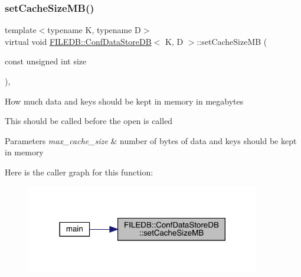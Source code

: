 \subsubsection{\texorpdfstring{setCacheSizeMB()}{setCacheSizeMB()}\hspace{0.1cm}{\footnotesize\ttfamily [1/2]}}
{\footnotesize\ttfamily template$<$typename K, typename D$>$ \\
virtual void \mbox{\hyperlink{classFILEDB_1_1ConfDataStoreDB}{F\+I\+L\+E\+D\+B\+::\+Conf\+Data\+Store\+DB}}$<$ K, D $>$\+::set\+Cache\+Size\+MB (\begin{DoxyParamCaption}\item[{const unsigned int}]{size }\end{DoxyParamCaption})\hspace{0.3cm}{\ttfamily [inline]}, {\ttfamily [virtual]}}

How much data and keys should be kept in memory in megabytes

This should be called before the open is called 
\begin{DoxyParams}{Parameters}
{\em max\+\_\+cache\+\_\+size} & number of bytes of data and keys should be kept in memory \\
\hline
\end{DoxyParams}
Here is the caller graph for this function\+:\nopagebreak
\begin{figure}[H]
\begin{center}
\leavevmode
\includegraphics[width=290pt]{d8/d19/classFILEDB_1_1ConfDataStoreDB_aa5fafbdd147d1b66d8fcc6821dc3804f_icgraph}
\end{center}
\end{figure}
\mbox{\label{classFILEDB_1_1ConfDataStoreDB_aa5fafbdd147d1b66d8fcc6821dc3804f}} 
